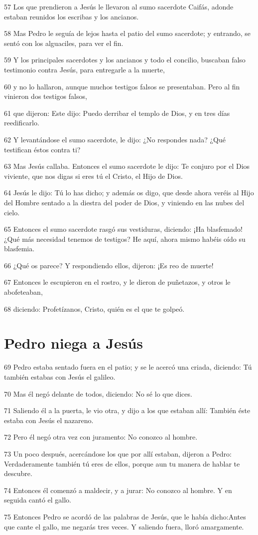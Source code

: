 \par 57 Los que prendieron a Jesús le llevaron al sumo sacerdote Caifás, adonde estaban reunidos los escribas y los ancianos.
\par 58 Mas Pedro le seguía de lejos hasta el patio del sumo sacerdote; y entrando, se sentó con los alguaciles, para ver el fin.
\par 59 Y los principales sacerdotes y los ancianos y todo el concilio, buscaban falso testimonio contra Jesús, para entregarle a la muerte,
\par 60 y no lo hallaron, aunque muchos testigos falsos se presentaban. Pero al fin vinieron dos testigos falsos,
\par 61 que dijeron: Este dijo: Puedo derribar el templo de Dios, y en tres días reedificarlo.
\par 62 Y levantándose el sumo sacerdote, le dijo: ¿No respondes nada? ¿Qué testifican éstos contra ti?
\par 63 Mas Jesús callaba. Entonces el sumo sacerdote le dijo: Te conjuro por el Dios viviente, que nos digas si eres tú el Cristo, el Hijo de Dios.
\par 64 Jesús le dijo: Tú lo has dicho; y además os digo, que desde ahora veréis al Hijo del Hombre sentado a la diestra del poder de Dios, y viniendo en las nubes del cielo.
\par 65 Entonces el sumo sacerdote rasgó sus vestiduras, diciendo: ¡Ha blasfemado! ¿Qué más necesidad tenemos de testigos? He aquí, ahora mismo habéis oído su blasfemia.
\par 66 ¿Qué os parece? Y respondiendo ellos, dijeron: ¡Es reo de muerte!
\par 67 Entonces le escupieron en el rostro, y le dieron de puñetazos, y otros le abofeteaban,
\par 68 diciendo: Profetízanos, Cristo, quién es el que te golpeó.

\section*{Pedro niega a Jesús}

\par 69 Pedro estaba sentado fuera en el patio; y se le acercó una criada, diciendo: Tú también estabas con Jesús el galileo.
\par 70 Mas él negó delante de todos, diciendo: No sé lo que dices.
\par 71 Saliendo él a la puerta, le vio otra, y dijo a los que estaban allí: También éste estaba con Jesús el nazareno.
\par 72 Pero él negó otra vez con juramento: No conozco al hombre.
\par 73 Un poco después, acercándose los que por allí estaban, dijeron a Pedro: Verdaderamente también tú eres de ellos, porque aun tu manera de hablar te descubre.
\par 74 Entonces él comenzó a maldecir, y a jurar: No conozco al hombre. Y en seguida cantó el gallo.
\par 75 Entonces Pedro se acordó de las palabras de Jesús, que le había dicho:Antes que cante el gallo, me negarás tres veces. Y saliendo fuera, lloró amargamente.

